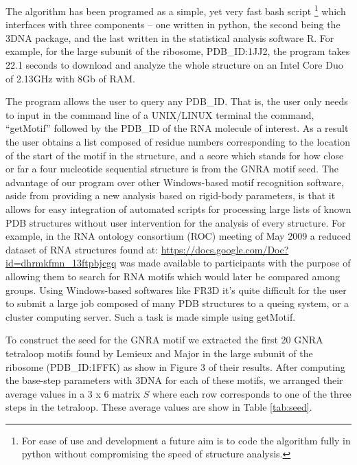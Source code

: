 The  algorithm has  been programed  as a  simple, yet  very  fast bash
script \footnote{For  ease of use and  development a future  aim is to
  code the algorithm fully in python without compromising the speed of
  structure analysis.}  which interfaces  with three components -- one
written in  python, the  second being the  3DNA package, and  the last
written in the statistical analysis  software R.  For example, for the
large subunit  of the ribosome,  PDB\_ID:1JJ2, the program  takes 22.1
seconds to download  and analyze the whole structure  on an Intel Core
Duo of 2.13GHz with 8Gb of RAM.

The program  allows the user to  query any PDB\_ID. That  is, the user
only needs to  input in the command line of  a UNIX/LINUX terminal the
command, ``getMotif'' followed  by the PDB\_ID of the  RNA molecule of
interest.  As  a result  the user obtains  a list composed  of residue
numbers corresponding to the location of the start of the motif in the
structure,  and a  score which  stands  for how  close or  far a  four
nucleotide  sequential structure  is from  the GNRA  motif  seed.  The
advantage of  our program  over other Windows-based  motif recognition
software,  aside from  providing a  new analysis  based  on rigid-body
parameters,  is  that it  allows  for  easy  integration of  automated
scripts  for processing large  lists of  known PDB  structures without
user intervention for the analysis of every structure. For example, in
the  RNA ontology  consortium  (ROC)  meeting of  May  2009 a  reduced
dataset        of        RNA        structures        found        at:
\url{https://docs.google.com/Doc?id=dhrmkfmn_13ftpbjcgq}    was   made
available to participants with the  purpose of allowing them to search
for  RNA motifs  which would  later be  compared among  groups.  Using
Windows-based  softwares   like  FR3D  \cite{sarver2008}   it's  quite
difficult for  the user  to submit  a large job  composed of  many PDB
structures to a  queing system, or a cluster  computing server. Such a
task is made simple using getMotif.

To construct  the seed for  the GNRA motif  we extracted the  first 20
GNRA tetraloop motifs found by Lemieux and Major \cite{lemieux2006} in
the large subunit of the ribosome (PDB\_ID:1FFK) as show in Figure 3 of
their results. After computing the  base-step parameters with 3DNA for
each of these motifs, we arranged their average values in a 3 x 6
matrix $S$ where each row corresponds to one of the three steps in the
tetraloop. These average values are show in Table \ref{tab:seed}.

